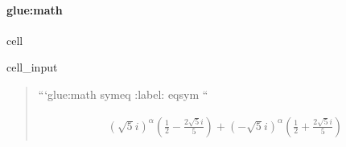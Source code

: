 \documentclass[letterpaper,10pt,english]{jupyterBook}
\begin{document}
\paragraph{glue:math}
\label{\detokenize{docs/01_01_Code_Blocks:glue-math}}
\begin{sphinxuseclass}{cell}\begin{sphinxVerbatimInput}

\begin{sphinxuseclass}{cell_input}
\begin{sphinxVerbatim}[commandchars=\\\{\}]
   
  
  
  
  
 \PYG{p}{[}\PYG{p}{]} 
\end{sphinxVerbatim}

\end{sphinxuseclass}\end{sphinxVerbatimInput}

\end{sphinxuseclass}\begin{quote}

\begin{sphinxVerbatim}[commandchars=\\\{\}]
```\PYGZob{}glue:math\PYGZcb{} sym\PYGZus{}eq
:label: eq\PYGZhy{}sym
``
\end{sphinxVerbatim}
\begin{equation}\label{equation:docs/01_01_Code_Blocks:eq-sym}
\begin{split}\displaystyle \left(\sqrt{5} i\right)^{\alpha} \left(\frac{1}{2} - \frac{2 \sqrt{5} i}{5}\right) + \left(- \sqrt{5} i\right)^{\alpha} \left(\frac{1}{2} + \frac{2 \sqrt{5} i}{5}\right)\end{split}
\end{equation}\end{quote}
\end{document}
